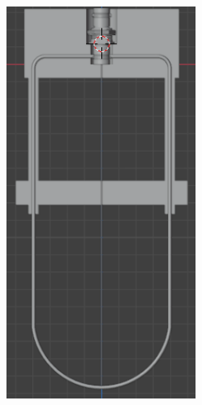 \begin{figure}[!ht]
	\begin{minipage}[c]{0.5\textwidth}
		\begin{subfigure}{\textwidth}
			\centering
			\includegraphics[width=0.678\textwidth]{Figures/31_03_2025/Modelo_3D_1}
			\captionsetup{width=0.8\textwidth}
			\subcaption{}
		\end{subfigure}
	\end{minipage}\begin{minipage}[c]{0.49\textwidth}
		\begin{subfigure}{\textwidth}
			\centering

\end{subfigure}
\end{minipage}
\end{figure}
